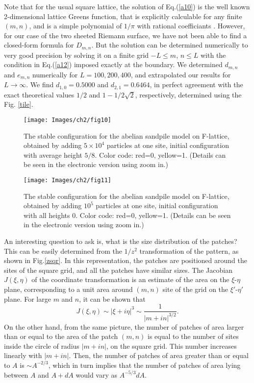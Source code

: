 \documentclass[11pt,a4paper]{book}
\begin{document}
Note that for the usual square lattice, the solution of Eq.(\ref{a10})
is the well known 2-dimensional lattice Greens function, that is explicitly 
calculable for any finite $(m,n)$, and is a simple polynomial of $1/\pi$ with rational coefficiants 
\cite{spitzer}. However, for our case of the two sheeted Riemann surface, 
we have not been able to find a closed-form formula for $D_{m,n}$.
But the solution can be determined 
numerically to very good precision by
solving it on a finite grid $-L \le m$, $n\le L$ with the condition in
Eq.(\ref{a12}) imposed exactly at the boundary. We determined $d_{m,n}$ 
and $e_{m,n}$ numerically for $L=100,200,400$, and extrapolated our 
results for $L\rightarrow\infty$. We find $d_{1,0}= 0.5000 $ and 
$d_{2,1} = 0.6464$, in perfect agreement with the exact theoretical 
values $1/2$ and $1- 1/2\sqrt{2}$, respectively, determined using the
Fig. \ref{tile}.
\begin{figure}
\begin{center}
    \texttt{[image: Images/ch2/fig10]} 
    \caption{The stable configuration for the abelian sandpile model on F-lattice, 
obtained by adding $5\times10^4$ particles at one site, initial configuration
with average height $5/8$. Color code: red=0, yellow=1. 
(Details can be seen in the electronic version using zoom in.)}
    \label{f5by8}
\end{center}
\end{figure}
\begin{figure}
\begin{center}
    \texttt{[image: Images/ch2/fig11]} 
    \caption{The stable configuration for the abelian sandpile model on F-lattice, 
obtained by adding $10^5$ particles at one site, 
initial configuration with all heights $0$. Color code: red=0, yellow=1. 
(Details can be seen in the electronic version using zoom in.)}
    \label{fzero}
\end{center}
\end{figure}

An interesting question to ask is, what is the size distribution of
the patches? This can be easily determined from the $1/z^{2}$
transformation of the pattern, as shown in Fig.\ref{zsqr}. In this
representation, the patches are positioned around the sites of the square grid, and all the patches
have similar sizes. The Jacobian $J(\xi,\eta)$ of the coordinate transformation is an estimate
of the area on the $\xi$-$\eta$ plane, corresponding to a unit area around
$(m,n)$ site of the grid on the $\xi'$-$\eta'$ plane. For large $m$ and $n$, it can be shown that
\begin{equation}
J(\xi,\eta)\sim |\xi+i\eta|^{3}\sim \frac{1}{|m+in|^{3/2}}.
\end{equation}
On the other hand, from the same picture, the number of patches of
area larger than or equal to the area of the patch $(m,n)$ is equal to the
number of sites inside the circle of radius $|m+in|$, on the square
grid. This number increases linearly with $ |m+in|$. Then, the number of patches of
area greater than or equal to $A$ is $\sim A^{-2/3}$, which in turn
implies that the number of patches of area lying between $A$ and
$A+dA$ would vary as $A^{-5/3}dA$.
\end{document}
